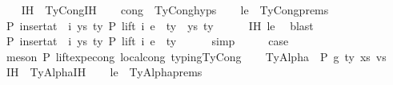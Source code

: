 \begin{isabellebody}
\ \ \isamarkupfalse%
\ IH\ {\isacharequal}{\kern0pt}\ TyCong{\isachardot}{\kern0pt}IH\isanewline
\ \ \isamarkupfalse%
\ cong\ {\isacharequal}{\kern0pt}\ TyCong{\isachardot}{\kern0pt}hyps{\isacharparenleft}{\kern0pt}{}{\isacharparenright}{\kern0pt}\isanewline
\ \ \isamarkupfalse%
\ le\ {\isacharequal}{\kern0pt}\ TyCong{\isachardot}{\kern0pt}prems\isanewline
\isanewline
\ \ \isamarkupfalse%
\ P{}{\isacharcolon}{\kern0pt}\ {\isachardoublequoteopen}insert{\isacharunderscore}{\kern0pt}at\ {\isasymGamma}\ i\ {\isacharparenleft}{\kern0pt}ys{\isacharcomma}{\kern0pt}\ ty{}{\isacharprime}{\kern0pt}{\isacharparenright}{\kern0pt}\ {\isasymturnstile}{\isacharbraceleft}{\kern0pt}P{\isacharbraceright}{\kern0pt}\ lift\ i\ e{}\ {\isacharcolon}{\kern0pt}\ ty{\isachardoublequoteclose}\ \ ys\ ty{}{\isacharprime}{\kern0pt}\isanewline
\ \ \ \ \isamarkupfalse%
\ IH\ le\ \isamarkupfalse%
\ blast\isanewline
\ \ \isamarkupfalse%
\ \isamarkupfalse%
\ P{}{\isacharcolon}{\kern0pt}\ {\isachardoublequoteopen}insert{\isacharunderscore}{\kern0pt}at\ {\isasymGamma}\ i\ {\isacharparenleft}{\kern0pt}ys{\isacharcomma}{\kern0pt}\ ty{}{\isacharprime}{\kern0pt}{\isacharparenright}{\kern0pt}\ {\isasymturnstile}{\isacharbraceleft}{\kern0pt}P{\isacharbraceright}{\kern0pt}\ lift\ i\ e{}\ {\isacharcolon}{\kern0pt}\ ty{\isachardoublequoteclose}\isanewline
\ \ \ \ \isamarkupfalse%
\ simp\isanewline
\ \ \isamarkupfalse%
\ \isamarkupfalse%
\ {\isacharquery}{\kern0pt}case\isanewline
\ \ \ \ \ \isamarkupfalse%
\ {\isacharparenleft}{\kern0pt}meson\ P{}\ lift{\isacharunderscore}{\kern0pt}exp{\isacharunderscore}{\kern0pt}econg\ local{\isachardot}{\kern0pt}cong\ typing{\isachardot}{\kern0pt}TyCong{\isacharparenright}{\kern0pt}\isanewline
\isanewline
{}\isamarkupfalse%
\isanewline
\ \ \isamarkupfalse%
\ {\isacharparenleft}{\kern0pt}TyAlpha\ {\isasymGamma}{}\ P\ g\ ty\ xs\ vs{\isacharparenright}{\kern0pt}\isanewline
\ \ \isamarkupfalse%
\ IH\ {\isacharequal}{\kern0pt}\ TyAlpha{\isachardot}{\kern0pt}IH\isanewline
\ \ \isamarkupfalse%
\ le\ {\isacharequal}{\kern0pt}\ TyAlpha{\isachardot}{\kern0pt}prems{\isacharparenleft}{\kern0pt}{}{\isacharparenright}{\kern0pt}\isanewline

\end{isabellebody}
